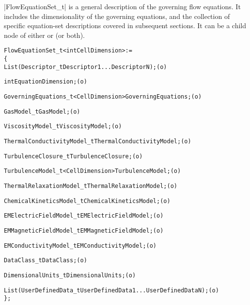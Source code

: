 |FlowEquationSet_t| is a general description of the governing flow
equations.
It includes the dimensionality of the governing equations, and the
collection of specific equation-set descriptions covered in subsequent
sections.
It can be a child node of either  or 
(or both).
\begin{alltt}
  FlowEquationSet\_t< int CellDimension > :=
    \{
    List( Descriptor\_t Descriptor1 ... DescriptorN ) ;                      (o)

    int EquationDimension ;                                                 (o)  
    
    GoverningEquations\_t<CellDimension> GoverningEquations ;                (o)

    GasModel\_t GasModel ;                                                   (o)

    ViscosityModel\_t ViscosityModel ;                                       (o)

    ThermalConductivityModel\_t ThermalConductivityModel ;                   (o)

    TurbulenceClosure\_t TurbulenceClosure ;                                 (o)

    TurbulenceModel\_t<CellDimension> TurbulenceModel ;                      (o)

    ThermalRelaxationModel\_t ThermalRelaxationModel ;                       (o)

    ChemicalKineticsModel\_t ChemicalKineticsModel ;                         (o)

    EMElectricFieldModel\_t EMElectricFieldModel ;                           (o)

    EMMagneticFieldModel\_t EMMagneticFieldModel ;                           (o)

    EMConductivityModel\_t EMConductivityModel ;                             (o)

    DataClass\_t DataClass ;                                                 (o)
                
    DimensionalUnits\_t DimensionalUnits ;                                   (o)

    List( UserDefinedData\_t UserDefinedData1 ... UserDefinedDataN ) ;       (o)
    \} ;
\end{alltt}

